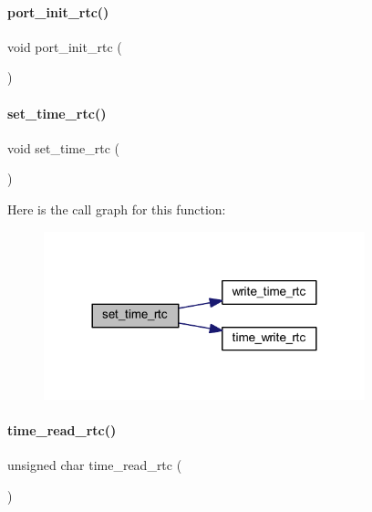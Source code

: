 \paragraph{port\+\_\+init\+\_\+rtc()}
{\footnotesize\ttfamily void port\+\_\+init\+\_\+rtc (\begin{DoxyParamCaption}{ }\end{DoxyParamCaption})}

\mbox{\label{a00041_af48611801cb8ae30f21f4263183355a4}} 
\paragraph{set\+\_\+time\+\_\+rtc()}
{\footnotesize\ttfamily void set\+\_\+time\+\_\+rtc (\begin{DoxyParamCaption}{ }\end{DoxyParamCaption})}

Here is the call graph for this function\+:
\nopagebreak
\begin{figure}[H]
\begin{center}
\leavevmode
\includegraphics[width=264pt]{a00041_af48611801cb8ae30f21f4263183355a4_cgraph}
\end{center}
\end{figure}
\mbox{\label{a00041_addeadab81b94cc879a2d7f1310fad7cd}} 
\paragraph{time\+\_\+read\+\_\+rtc()}
{\footnotesize\ttfamily unsigned char time\+\_\+read\+\_\+rtc (\begin{DoxyParamCaption}{ }\end{DoxyParamCaption})}

